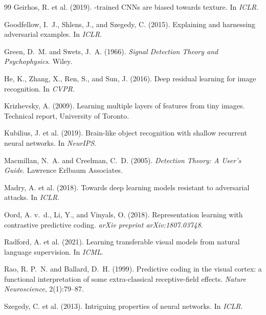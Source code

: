 \documentclass[12pt,a4paper]{article}
\begin{document}
\begin{thebibliography}{99}
Geirhos, R. et al. (2019).
-trained {CNNs} are biased towards texture.
\newblock In \emph{ICLR}.

Goodfellow, I.~J., Shlens, J., and Szegedy, C. (2015).
\newblock Explaining and harnessing adversarial examples.
\newblock In \emph{ICLR}.

Green, D.~M. and Swets, J.~A. (1966).
\newblock \emph{Signal Detection Theory and Psychophysics}.
\newblock Wiley.

He, K., Zhang, X., Ren, S., and Sun, J. (2016).
\newblock Deep residual learning for image recognition.
\newblock In \emph{CVPR}.

Krizhevsky, A. (2009).
\newblock Learning multiple layers of features from tiny images.
\newblock Technical report, University of Toronto.

Kubilius, J. et al. (2019).
\newblock Brain-like object recognition with shallow recurrent neural networks.
\newblock In \emph{NeurIPS}.

Macmillan, N.~A. and Creelman, C.~D. (2005).
\newblock \emph{Detection Theory: A User's Guide}.
\newblock Lawrence Erlbaum Associates.

Madry, A. et al. (2018).
\newblock Towards deep learning models resistant to adversarial attacks.
\newblock In \emph{ICLR}.

Oord, A. v.~d., Li, Y., and Vinyals, O. (2018).
\newblock Representation learning with contrastive predictive coding.
\newblock \emph{arXiv preprint arXiv:1807.03748}.

Radford, A. et al. (2021).
\newblock Learning transferable visual models from natural language supervision.
\newblock In \emph{ICML}.

Rao, R. P.~N. and Ballard, D.~H. (1999).
\newblock Predictive coding in the visual cortex: a functional interpretation of some extra-classical receptive-field effects.
\newblock \emph{Nature Neuroscience}, 2(1):79--87.

Szegedy, C. et al. (2013).
\newblock Intriguing properties of neural networks.
\newblock In \emph{ICLR}.


\end{thebibliography}
\end{document}
